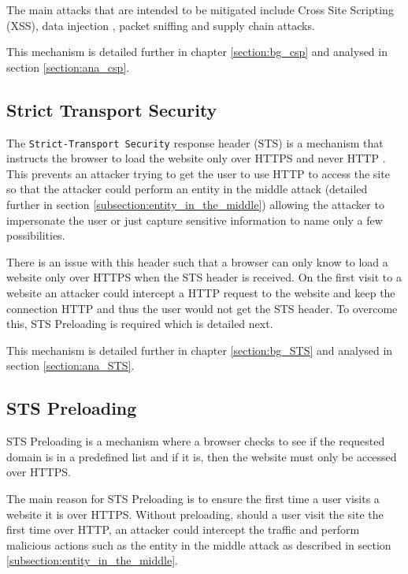 \documentclass{mscreport}
\begin{document}
\vspace{0.3cm} \noindent
The main attacks that are intended to be mitigated include Cross Site Scripting (XSS), data injection , packet sniffing and supply chain attacks.

\vspace{0.3cm} \noindent
This mechanism is detailed further in chapter \ref{section:bg_csp} and analysed in section \ref{section:ana_csp}.


\subsection{Strict Transport Security}
The \texttt{Strict-Transport Security} response header (STS) is a mechanism that instructs the browser to load the website only over HTTPS and never HTTP \cite{Hodges2012-pe}. This prevents an attacker trying to get the user to use HTTP to access the site so that the attacker could perform an entity in the middle attack (detailed further in section \ref{subsection:entity_in_the_middle}) allowing the attacker to impersonate the user or just capture sensitive information to name only a few possibilities.

\vspace{0.3cm} \noindent
There is an issue with this header such that a browser can only know to load a website only over HTTPS when the STS header is received. On the first visit to a website an attacker could intercept a HTTP request to the website and keep the connection HTTP and thus the user would not get the STS header. To overcome this, STS Preloading is required which is detailed next.

\vspace{0.3cm} \noindent
This mechanism is detailed further in chapter \ref{section:bg_STS} and analysed in section \ref{section:ana_STS}.


\subsection{STS Preloading}
STS Preloading is a mechanism where a browser checks to see if the requested domain is in a predefined list and if it is, then the website must only be accessed over HTTPS.

\vspace{0.3cm} \noindent
The main reason for STS Preloading is to ensure the first time a user visits a website it is over HTTPS. Without preloading, should a user visit the site the first time over HTTP, an attacker could intercept the traffic and perform malicious actions such as the entity in the middle attack as described in section \ref{subsection:entity_in_the_middle}.
\end{document}
